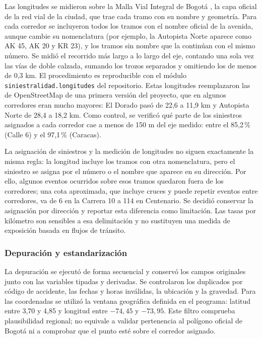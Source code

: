 \documentclass[12pt,letterpaper]{article}
\begin{document}
Las longitudes se midieron sobre la Malla Vial Integral de Bogotá
\citep{ideca}, la capa oficial de la red vial de la ciudad, que trae cada
tramo con su nombre y geometría. Para cada corredor se incluyeron
todos los tramos con el nombre oficial de la avenida, aunque cambie su
nomenclatura (por ejemplo, la Autopista Norte aparece como AK 45, AK 20
y KR 23), y los tramos sin nombre que la continúan con el mismo número.
Se midió el recorrido más largo a lo largo del eje, contando una sola
vez las vías de doble calzada, sumando los trozos separados y omitiendo
los de menos de 0,3 km. El procedimiento es reproducible con el módulo
\texttt{siniestralidad.longitudes} del repositorio. Estas longitudes
reemplazaron las de OpenStreetMap de una primera versión del proyecto,
que en algunos corredores eran mucho mayores: El Dorado pasó de 22,6 a
11,9 km y Autopista Norte de 28,4 a 18,2 km. Como control, se verificó
qué parte de los siniestros asignados a cada corredor cae a menos de
150 m del eje medido: entre el 85,2\,\% (Calle 6) y el 97,1\,\%
(Caracas).

La asignación de siniestros y la medición de longitudes no siguen
exactamente la misma regla: la longitud incluye los tramos con otra
nomenclatura, pero el siniestro se asigna por el número o el nombre que
aparece en su dirección. Por ello, algunos eventos ocurridos sobre esos
tramos quedaron fuera de los corredores; una cota aproximada, que
incluye cruces y puede repetir eventos entre corredores, va de 6 en la
Carrera 10 a 114 en Centenario. Se decidió conservar la asignación por
dirección y reportar esta diferencia como limitación. Las tasas por kilómetro
son sensibles a esa delimitación y no sustituyen una medida de exposición
basada en flujos de tránsito.

\hypertarget{etapa-3-depuraciuxf3n-y-estandarizaciuxf3n}{%
\subsubsection{Depuración y estandarización}\label{etapa-3-depuraciuxf3n-y-estandarizaciuxf3n}}

La depuración se ejecutó de forma secuencial y conservó los campos
originales junto con las variables tipadas y derivadas. Se controlaron
los duplicados por código de accidente, las fechas y horas inválidas, la
ubicación y la gravedad. Para las coordenadas se utilizó la ventana
geográfica definida en el programa: latitud entre 3,70 y 4,85 y longitud
entre $-74,45$ y $-73,95$. Este filtro comprueba plausibilidad regional;
no equivale a validar pertenencia al polígono oficial de Bogotá ni a
comprobar que el punto esté sobre el corredor asignado.
\end{document}
